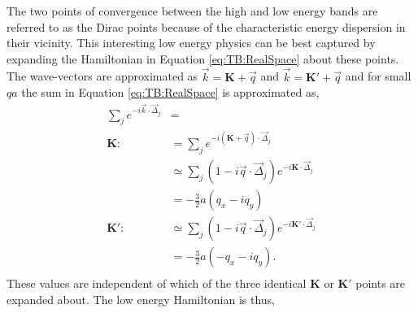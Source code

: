 The two points of convergence between the high and low energy bands are referred to as the Dirac points because of the characteristic energy dispersion in their vicinity.
This interesting low energy physics can be best captured by expanding the Hamiltonian in Equation \ref{eq:TB:RealSpace} about these points.
The wave-vectors are approximated as $\vec{k}=\bm{K}+\vec{q}$ and $\vec{k}=\bm{K'}+\vec{q}$ and for small $qa$ the sum in Equation \ref{eq:TB:RealSpace} is approximated as,
\begin{align*}
	\sum_{j} e^{-i \vec{k} \cdot \vec{\Delta}_j}&= \\
	\bm{K:}\ 	&=\sum_{j} e^{-i (\bm{K}+\vec{q}) \cdot \vec{\Delta}_j} \\
				&\simeq \sum_{j} (1-i \vec{q} \cdot \vec{\Delta}_j) e^{-i \bm{K} \cdot \vec{\Delta}_j} \\
				&=-\frac{3}{2} a \left( q_x-i q_y \right) \\
	\bm{K':}\	&\simeq \sum_{j} (1-i \vec{q} \cdot \vec{\Delta}_j) e^{-i \bm{K'} \cdot \vec{\Delta}_j} \\
				&=-\frac{3}{2} a \left(-q_x-i q_y \right) . \\
\end{align*}
These values are independent of which of the three identical $\bm{K}$ or $\bm{K'}$ points are expanded about.
The low energy Hamiltonian is thus,
